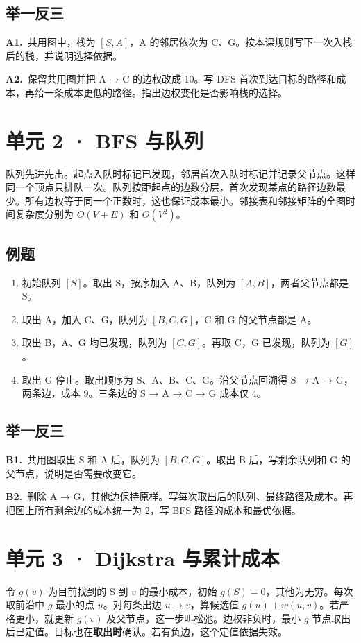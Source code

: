 \documentclass[UTF8,a4paper,11pt]{ctexart}
\newcommand{\PracticeQuestion}[3]{\par\Needspace{4\baselineskip}\noindent\begin{minipage}{\linewidth}\textbf{#1.}\ #2\par\noindent\rule{0pt}{#3mm}\par\end{minipage}\par}
\begin{document}
\subsection{举一反三}
\PracticeQuestion{A1}{共用图中，栈为 $[S,A]$，A 的邻居依次为 C、G。按本课规则写下一次入栈后的栈，并说明选择依据。}{23}
\PracticeQuestion{A2}{保留共用图并把 A → C 的边权改成 10。写 DFS 首次到达目标的路径和成本，再给一条成本更低的路径。指出边权变化是否影响栈的选择。}{26}
\clearpage
\section{单元 2 · BFS 与队列}
队列先进先出。起点入队时标记已发现，邻居首次入队时标记并记录父节点。这样同一个顶点只排队一次。队列按距起点的边数分层，首次发现某点的路径边数最少。所有边权等于同一个正数时，这也保证成本最小。邻接表和邻接矩阵的全图时间复杂度分别为 $O(V+E)$ 和 $O(V^2)$。

\subsection{例题}
\begin{enumerate}
\item 初始队列 $[S]$。取出 S，按序加入 A、B，队列为 $[A,B]$，两者父节点都是 S。
\item 取出 A，加入 C、G，队列为 $[B,C,G]$，C 和 G 的父节点都是 A。
\item 取出 B，A、G 均已发现，队列为 $[C,G]$。再取 C，G 已发现，队列为 $[G]$。
\item 取出 G 停止。取出顺序为 S、A、B、C、G。沿父节点回溯得 S → A → G，两条边，成本 9。三条边的 S → A → C → G 成本仅 4。
\end{enumerate}
\subsection{举一反三}
\PracticeQuestion{B1}{共用图取出 S 和 A 后，队列为 $[B,C,G]$。取出 B 后，写剩余队列和 G 的父节点，说明是否需要改变它。}{24}
\PracticeQuestion{B2}{删除 A → G，其他边保持原样。写每次取出后的队列、最终路径及成本。再把图上所有剩余边的成本统一为 2，写 BFS 路径的成本和最优依据。}{34}
\clearpage
\section{单元 3 · Dijkstra 与累计成本}
令 $g(v)$ 为目前找到的 S 到 $v$ 的最小成本，初始 $g(S)=0$，其他为无穷。每次取前沿中 $g$ 最小的点 $u$。对每条出边 $u\to v$，算候选值 $g(u)+w(u,v)$。若严格更小，就更新 $g(v)$ 及父节点，这一步叫松弛。边权非负时，最小 $g$ 节点取出后已定值。目标也在\textbf{取出时}确认。若有负边，这个定值依据失效。
\end{document}

